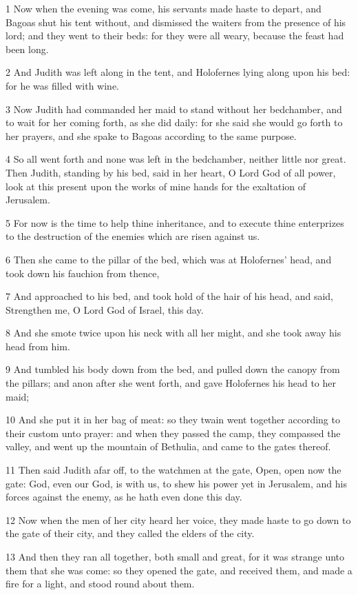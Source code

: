 \par 1 Now when the evening was come, his servants made haste to depart, and Bagoas shut his tent without, and dismissed the waiters from the presence of his lord; and they went to their beds: for they were all weary, because the feast had been long.
\par 2 And Judith was left along in the tent, and Holofernes lying along upon his bed: for he was filled with wine.
\par 3 Now Judith had commanded her maid to stand without her bedchamber, and to wait for her coming forth, as she did daily: for she said she would go forth to her prayers, and she spake to Bagoas according to the same purpose.
\par 4 So all went forth and none was left in the bedchamber, neither little nor great. Then Judith, standing by his bed, said in her heart, O Lord God of all power, look at this present upon the works of mine hands for the exaltation of Jerusalem.
\par 5 For now is the time to help thine inheritance, and to execute thine enterprizes to the destruction of the enemies which are risen against us.
\par 6 Then she came to the pillar of the bed, which was at Holofernes' head, and took down his fauchion from thence,
\par 7 And approached to his bed, and took hold of the hair of his head, and said, Strengthen me, O Lord God of Israel, this day.
\par 8 And she smote twice upon his neck with all her might, and she took away his head from him.
\par 9 And tumbled his body down from the bed, and pulled down the canopy from the pillars; and anon after she went forth, and gave Holofernes his head to her maid;
\par 10 And she put it in her bag of meat: so they twain went together according to their custom unto prayer: and when they passed the camp, they compassed the valley, and went up the mountain of Bethulia, and came to the gates thereof.
\par 11 Then said Judith afar off, to the watchmen at the gate, Open, open now the gate: God, even our God, is with us, to shew his power yet in Jerusalem, and his forces against the enemy, as he hath even done this day.
\par 12 Now when the men of her city heard her voice, they made haste to go down to the gate of their city, and they called the elders of the city.
\par 13 And then they ran all together, both small and great, for it was strange unto them that she was come: so they opened the gate, and received them, and made a fire for a light, and stood round about them.
